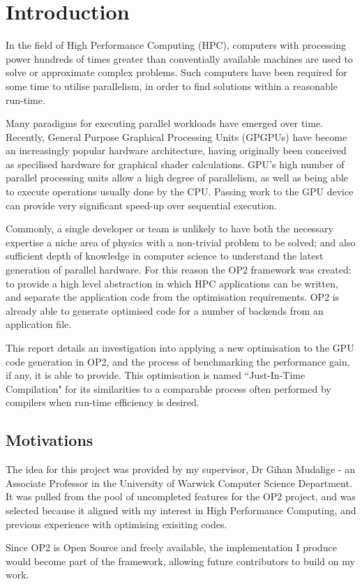 \section{Introduction}

In the field of High Performance Computing (HPC), computers with processing power hundreds of times greater than conventially available machines are used to solve or approximate complex problems. Such computers have been required for some time to utilise parallelism, in order to find solutions within a reasonable run-time.
\par Many paradigms for executing parallel workloads have emerged over time. Recently, General Purpose Graphical Processing Units (GPGPUs) have become an increasingly popular hardware architecture, having originally been conceived as specilised hardware for graphical shader calculations. GPU's high number of parallel processing units allow a high degree of parallelism, as well as being able to execute operations usually done by the CPU. Passing work to the GPU device can provide very significant speed-up over sequential execution.
\par
Commonly, a single developer or team is unlikely to have both the necessary expertise a niche area of physics with a non-trivial problem to be solved; and also sufficient depth of knowledge in computer science to understand the latest generation of parallel hardware. For this reason the OP2 framework was created: to provide a high level abstraction in which HPC applications can be written, and separate the application code from the optimisation requirements. OP2 is already able to generate optimised code for a number of backends from an application file.
\par
This report details an investigation into applying a new optimisation to the GPU code generation in OP2, and the process of benchmarking the performance gain, if any, it is able to provide.
This optimisation is named ``Just-In-Time Compilation" for its similarities to a comparable process often performed by compilers when run-time efficiency is desired.
\vfill
\subsection{Motivations}
The idea for this project was provided by my supervisor, Dr Gihan Mudalige - an Associate Professor in the University of Warwick Computer Science Department. It was pulled from the pool of uncompleted features for the OP2 project, and was selected because it aligned with my interest in High Performance Computing, and previous experience with optimising exisiting codes.
\par
Since OP2 is Open Source and freely available, the implementation I produce would become part of the framework, allowing future contributors to build on my work.

